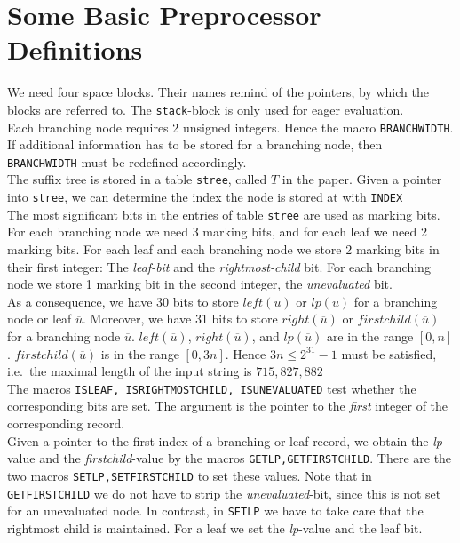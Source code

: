 \documentclass[a4paper]{article}
\begin{document}
\section{Some Basic Preprocessor Definitions}

We need four space blocks. Their names remind of the pointers, by which
the blocks are referred to. The \texttt{stack}-block is only used for
eager evaluation.\\

Each branching node requires 2 unsigned integers. Hence the macro
\texttt{BRANCHWIDTH}. If additional information has to be stored for a
branching node, then \texttt{BRANCHWIDTH} must be redefined accordingly.\\

The suffix tree is stored in a table \texttt{stree}, called \(T\) in the
paper. Given a pointer into \texttt{stree}, we can determine the index the
node is stored at with \texttt{INDEX}\\

The most significant bits in the entries of table \texttt{stree} are used as
marking bits. For each branching node we need 3 marking bits, and for each leaf
we need 2 marking bits. For each leaf and each branching node we store 2
marking bits in their first integer: The \emph{leaf-bit} and the
\emph{rightmost-child} bit. For each branching node we store 1 marking bit in
the second integer, the \emph{unevaluated} bit.\\

As a consequence, we have 30 bits to store \(\mathit{left}(\overline{u})\) or
\(\mathit{lp}(\overline{u})\) for a branching node or leaf \(\overline{u}\).
Moreover, we have 31 bits to store \(\mathit{right}(\overline{u})\) or
\(\mathit{firstchild}(\overline{u})\) for a branching node \(\overline{u}\).
\(\mathit{left}(\overline{u})\), \(\mathit{right}(\overline{u})\), and
\(\mathit{lp}(\overline{u})\) are in the range \([0,n]\).
\(\mathit{firstchild}(\overline{u})\) is in the range \([0,3n]\). Hence
\(3n\leq 2^{31}-1\) must be satisfied, i.e.\ the maximal length of the input
string is \(715{,}827{,}882\)\\

The macros \texttt{ISLEAF, ISRIGHTMOSTCHILD, ISUNEVALUATED} test whether the
corresponding bits are set. The argument is the pointer to the \emph{first}
integer of the corresponding record.\\

Given a pointer to the first index of a branching or leaf record, we obtain the
\emph{lp}-value and the \emph{firstchild}-value by the macros
\texttt{GETLP,GETFIRSTCHILD}. There are the two macros
\texttt{SETLP,SETFIRSTCHILD} to set these values. Note that in
\texttt{GETFIRSTCHILD} we do not have to strip the \emph{unevaluated}-bit,
since this is not set for an unevaluated node. In contrast, in \texttt{SETLP}
we have to take care that the rightmost child is maintained. For a leaf we set
the \emph{lp}-value and the leaf bit.\\
\end{document}
